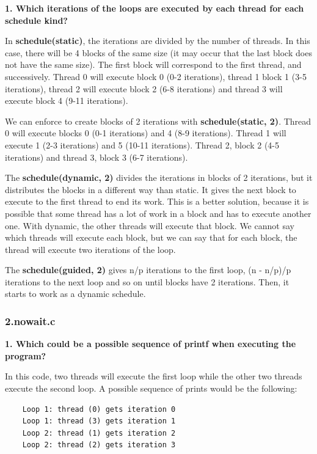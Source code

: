 \documentclass[12pt, a4paper]{article}
\begin{document}
\textbf{1. Which iterations of the loops are executed by each thread for each schedule kind?}

In \textbf{schedule(static)}, the iterations are divided by the number of threads. In this case, there will be 4 blocks of the same size (it may occur that the last block does not have the same size). The first block will correspond to the first thread, and successively. Thread 0 will execute block 0 (0-2 iterations), thread 1 block 1 (3-5 iterations), thread 2 will execute block 2 (6-8 iterations) and thread 3 will execute block 4 (9-11 iterations).

We can enforce to create blocks of 2 iterations with \textbf{schedule(static, 2)}. Thread 0 will execute blocks 0 (0-1 iterations) and 4 (8-9 iterations). Thread 1 will execute 1 (2-3 iterations) and 5 (10-11 iterations). Thread 2, block 2 (4-5 iterations) and thread 3, block 3 (6-7 iterations).

The \textbf{schedule(dynamic, 2)} divides the iterations in blocks of 2 iterations, but it distributes the blocks in a different way than static. It gives the next block to execute to the first thread to end its work. This is a better solution, because it is possible that some thread has a lot of work in a block and has to execute another one. With dynamic, the other threads will execute that block. We cannot say which threads will execute each block, but we can say that for each block, the thread will execute two iterations of the loop.

The \textbf{schedule(guided, 2)} gives n/p iterations to the first loop, (n - n/p)/p iterations to the next loop and so on until blocks have 2 iterations. Then, it starts to work as a dynamic schedule.

\subsubsection{2.nowait.c}

\textbf{1. Which could be a possible sequence of printf when executing the program?}

In this code, two threads will execute the first loop while the other two threads execute the second loop. A possible sequence of prints would be the following:

\begin{lstlisting}
	Loop 1: thread (0) gets iteration 0
	Loop 1: thread (3) gets iteration 1
	Loop 2: thread (1) gets iteration 2
	Loop 2: thread (2) gets iteration 3
\end{lstlisting}
\end{document}

